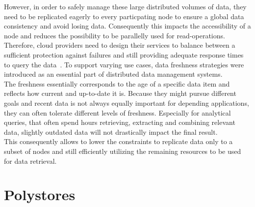 However, in order to safely manage these large distributed volumes of data, they need to be replicated eagerly to 
every particpating node to ensure a global data consistency and avoid losing data. 
Consequently this impacts the accessibility of a node and reduces the possibility to be parallelly used for read-operations.
Therefore, cloud providers need to design their services 
to balance between a sufficient protection against failures and still providing adequate response times to query the data~\cite{cap2002, levandowski2013}.
To support varying use cases, data freshness strategies were introduced as an essential part of distributed data management systems.\\
The freshness essentially corresponds to the age of a specific data item and reflects how current and up-to-date it is.
Because they might pursue different goals and recent data is not always equally important for depending applications, they can often tolerate different levels of freshness.
Especially for analytical queries, that often spend hours retrieving, extracting and combining relevant data, slightly outdated data will not drastically 
impact the final result.\\
This consequently allows to lower the constraints to replicate data only to a subset of nodes and still efficiently 
utilizing the remaining resources to be used for data retrieval.




\section{Polystores}

